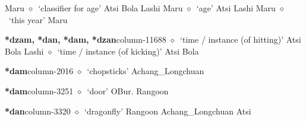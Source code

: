 \hspace{1ex}
         Maru 
\hspace{1ex}
         $\diamond$~`classifier for age'
         Atsi 
\hspace{1ex}
         Bola 
\hspace{1ex}
         Lashi 
\hspace{1ex}
         Maru 
\hspace{1ex}
         $\diamond$~`age'
         Atsi 
\hspace{1ex}
         Lashi 
\hspace{1ex}
         Maru 
\hspace{1ex}
         $\diamond$~`this year'
         Maru 
  \item {\footnotesize \textbf{*dzam, *dan, *dam, *dzan}}{\tiny column-11688}
         $\diamond$~`time / instance (of hitting)'
         Atsi 
\hspace{1ex}
         Bola 
\hspace{1ex}
         Lashi 
\hspace{1ex}
         $\diamond$~`time / instance (of kicking)'
         Atsi 
\hspace{1ex}
         Bola 
  \item {\footnotesize \textbf{*dam}}{\tiny column-2016}
         $\diamond$~`chopsticks'
         Achang\_Longchuan 
  \item {\footnotesize \textbf{*dam}}{\tiny column-3251}
         $\diamond$~`door'
         OBur. 
\hspace{1ex}
         Rangoon 
  \item {\footnotesize \textbf{*dan}}{\tiny column-3320}
         $\diamond$~`dragonfly'
         Rangoon 
\hspace{1ex}
         Achang\_Longchuan 
\hspace{1ex}
         Atsi 
\hspace{1ex}
